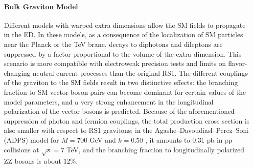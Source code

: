 \paragraph{Bulk Graviton Model}

Different models with warped extra dimensions allow the SM fields to propagate in the ED. In these models, as a consequence of the localization of SM particles near the Planck or the TeV brane, decays to diphotons and dileptons are suppressed by a factor proportional to the volume of the extra dimension. This scenario is more compatible with electroweak precision tests and limits on flavor-changing neutral current processes than the original RS1. The different couplings of the graviton to the SM fields result in two distinctive effects: the branching fraction to SM vector-boson pairs can become dominant for certain values of the model parameters, and a very strong enhancement in the longitudinal polarization of the vector bosons is predicted. Because of the aforementioned suppression of photon and fermion couplings, the total production cross section is also smaller with respect to RS1 gravitons: in the Agashe–Davoudiasl–Perez–Soni (ADPS) model \cite{Aga} for $M = 700$ GeV and $\tilde{k}= 0.50$ , it amounts to 0.31 pb in pp collisions at $\sqrt{s} = 7$ TeV, and the branching fraction to longitudinally polarized ZZ bosons is about 12$\%$.




